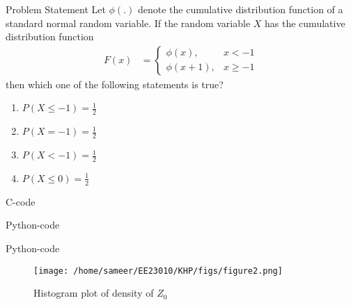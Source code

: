 \documentclass{beamer}
\begin{document}
\begin{frame}{Problem Statement}
  Let $\phi(.)$ denote the cumulative distribution function of a standard normal
random variable. If the random variable $X$ has the cumulative distribution
function 
\begin{align}
	F(x)&= 
    \begin{cases}
        \phi(x), &  x < -1 \\
        \phi(x+1) , &  x \ge -1
    \end{cases} \label{eq:15st/2023}
\end{align}
then which one of the following statements is true?
\begin{enumerate}
\item $P(X \leq -1) = \frac{1}{2}$
\item $P(X = -1) = \frac{1}{2}$
\item $P(X < -1) = \frac{1}{2}$
\item $P(X \leq 0) = \frac{1}{2}$
\end{enumerate}
\end{frame}

\begin{frame}[allowframebreaks]{C-code}
  
\end{frame}

\begin{frame}{Python-code}
  
\end{frame}

\begin{frame}{Python-code}
\begin{figure}
  \centering
  \texttt{[image: /home/sameer/EE23010/KHP/figs/figure2.png]}  %
  \caption{Histogram plot of density of $Z_0$}
  \label{fig:your_label}
\end{figure}
\end{frame}
\end{document}
